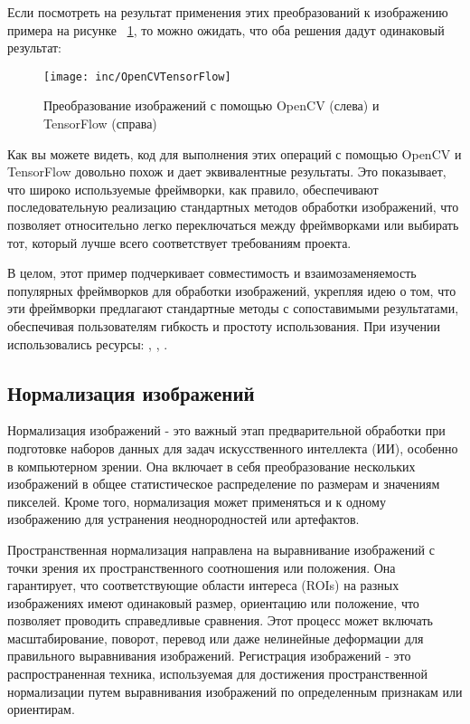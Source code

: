 Если посмотреть на результат применения этих преобразований к изображению примера на рисунке ~\ref{fig:fig03}, то можно ожидать, что оба решения дадут одинаковый результат:

\begin{figure}
  \texttt{[image: inc/OpenCVTensorFlow]}
  \caption{Преобразование изображений с помощью OpenCV (слева) и TensorFlow (справа)}
  \label{fig:fig03}
\end{figure}

Как вы можете видеть, код для выполнения этих операций с помощью OpenCV и TensorFlow довольно похож и дает эквивалентные результаты. Это показывает, что широко используемые фреймворки, как правило, обеспечивают последовательную реализацию стандартных методов обработки изображений, что позволяет относительно легко переключаться между фреймворками или выбирать тот, который лучше всего соответствует требованиям проекта.

В целом, этот пример подчеркивает совместимость и взаимозаменяемость популярных фреймворков для обработки изображений, укрепляя идею о том, что эти фреймворки предлагают стандартные методы с сопоставимыми результатами, обеспечивая пользователям гибкость и простоту использования.
При изучении использовались ресурсы: \cite{33}, \cite{35}, \cite{34}.

\subsection{Нормализация изображений}

Нормализация изображений - это важный этап предварительной обработки при подготовке наборов данных для задач искусственного интеллекта (ИИ), особенно в компьютерном зрении. Она включает в себя преобразование нескольких изображений в общее статистическое распределение по размерам и значениям пикселей. Кроме того, нормализация может применяться и к одному изображению для устранения неоднородностей или артефактов.

Пространственная нормализация направлена на выравнивание изображений с точки зрения их пространственного соотношения или положения. Она гарантирует, что соответствующие области интереса (ROIs) на разных изображениях имеют одинаковый размер, ориентацию или положение, что позволяет проводить справедливые сравнения. Этот процесс может включать масштабирование, поворот, перевод или даже нелинейные деформации для правильного выравнивания изображений. Регистрация изображений - это распространенная техника, используемая для достижения пространственной нормализации путем выравнивания изображений по определенным признакам или ориентирам.

